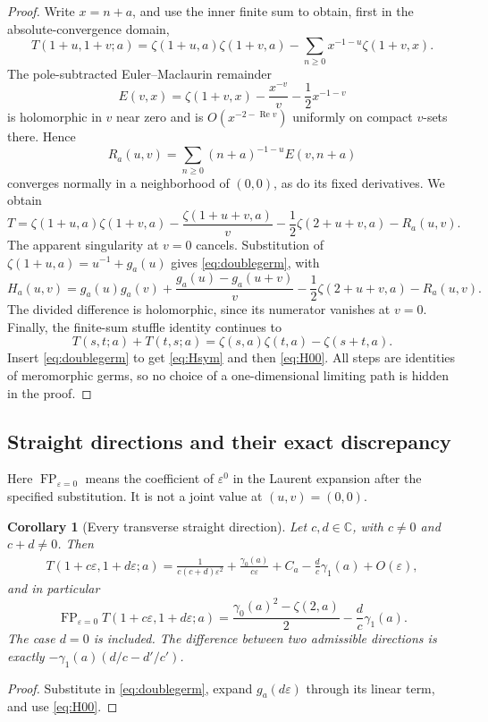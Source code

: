 \documentclass[11pt,letterpaper]{article}
\numberwithin{equation}{section}
\theoremstyle{plain}
\newtheorem{corollary}[theorem]{Corollary}
\theoremstyle{definition}
\theoremstyle{remark}
\DeclareMathOperator{\FP}{FP}
\DeclareMathOperator{\Rea}{Re}
\newcommand{\C}{\mathbb C}
\newcommand{\eps}{\varepsilon}
\begin{document}
\begin{proof}
Write $x=n+a$, and use the inner finite sum to obtain, first in the
absolute-convergence domain,
\[
 T(1+u,1+v;a)=\zeta(1+u,a)\zeta(1+v,a)
       -\sum_{n\ge0}x^{-1-u}\zeta(1+v,x).
\]
The pole-subtracted Euler--Maclaurin remainder
\[
 E(v,x)=\zeta(1+v,x)-\frac{x^{-v}}v-\frac12x^{-1-v}
\]
is holomorphic in $v$ near zero and is
$O(x^{-2-\Rea v})$ uniformly on compact $v$-sets there. Hence
\[
 R_a(u,v)=\sum_{n\ge0}(n+a)^{-1-u}E(v,n+a)
\]
converges normally in a neighborhood of $(0,0)$, as do its fixed
derivatives. We obtain
\begin{equation}\label{eq:doubleEM}
 T=\zeta(1+u,a)\zeta(1+v,a)
   -\frac{\zeta(1+u+v,a)}v
   -\frac12\zeta(2+u+v,a)-R_a(u,v).
\end{equation}
The apparent singularity at $v=0$ cancels. Substitution of
$\zeta(1+u,a)=u^{-1}+g_a(u)$ gives \eqref{eq:doublegerm}, with
\begin{equation}\label{eq:Hrepresentation}
 H_a(u,v)=g_a(u)g_a(v)
  +\frac{g_a(u)-g_a(u+v)}v
  -\frac12\zeta(2+u+v,a)-R_a(u,v).
\end{equation}
The divided difference is holomorphic, since its numerator vanishes at
$v=0$. Finally, the finite-sum stuffle identity continues to
\[
 T(s,t;a)+T(t,s;a)=\zeta(s,a)\zeta(t,a)-\zeta(s+t,a).
\]
Insert \eqref{eq:doublegerm} to get \eqref{eq:Hsym} and then
\eqref{eq:H00}. All steps are identities of meromorphic germs, so no
choice of a one-dimensional limiting path is hidden in the proof.
\end{proof}

\subsection{Straight directions and their exact discrepancy}

Here $\FP_{\eps=0}$ means the coefficient of $\eps^0$ in the Laurent
expansion after the specified substitution. It is not a joint value at
$(u,v)=(0,0)$.

\begin{corollary}[Every transverse straight direction]\label{cor:direction}
Let $c,d\in\C$, with $c\ne0$ and $c+d\ne0$. Then
\begin{align}\label{eq:direction-expansion}
 T(1+c\eps,1+d\eps;a)
  =\frac1{c(c+d)\eps^2}
     +\frac{\gamma_0(a)}{c\eps}
     +C_a-\frac dc\gamma_1(a)+O(\eps),
\end{align}
and in particular
\begin{equation}\label{eq:direction-FP}
 \boxed{\FP_{\eps=0}T(1+c\eps,1+d\eps;a)
   =\frac{\gamma_0(a)^2-\zeta(2,a)}2-\frac dc\gamma_1(a).}
\end{equation}
The case $d=0$ is included. The difference between two admissible
directions is exactly
$-\gamma_1(a)(d/c-d'/c')$.
\end{corollary}
\begin{proof}
Substitute in \eqref{eq:doublegerm}, expand $g_a(d\eps)$ through its
linear term, and use \eqref{eq:H00}.
\end{proof}
\end{document}
